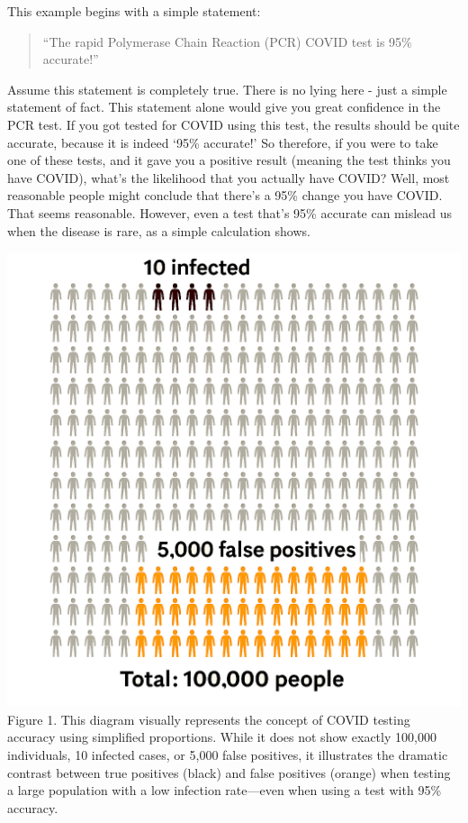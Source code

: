 \documentclass[10pt]{article}
\newenvironment{Figure}
  {\par\medskip\noindent\minipage{\linewidth}}
  {\endminipage\par\medskip}
\begin{document}
\begin{multicols}{2}
This example begins with a simple statement:
\begin{quotation}
``The rapid Polymerase Chain Reaction (PCR) COVID test is 95\% accurate!''
\end{quotation}
Assume this statement is completely true. There is no lying here - just a simple statement of fact. This statement alone would give you great confidence in the PCR test. If you got tested for COVID using this test, the results should be quite accurate, because it is indeed `95\% accurate!' So therefore, if you were to take one of these tests, and it gave you a positive result (meaning the test thinks you have COVID), what's the likelihood that you actually have COVID? Well, most reasonable people might conclude that there's a 95\% change you have COVID. That seems reasonable. However, even a test that's 95\% accurate can mislead us when the disease is rare, as a simple calculation shows.

\begin{Figure}
\centering
\includegraphics[width=\textwidth]{infection_diagram.jpg}
{\footnotesize Figure 1. This diagram visually represents the concept of COVID testing accuracy using simplified proportions. While it does not show exactly 100,000 individuals, 10 infected cases, or 5,000 false positives, it illustrates the dramatic contrast between true positives (black) and false positives (orange) when testing a large population with a low infection rate—even when using a test with 95\% accuracy.}
\end{Figure}


\end{multicols}
\end{document}
